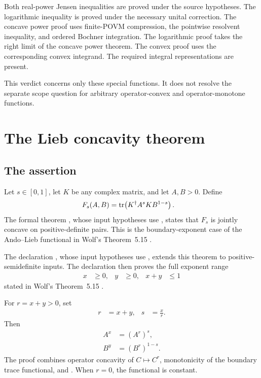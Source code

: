 \documentclass{article}
\begin{document}
Both real-power Jensen inequalities are proved under the source hypotheses.
The logarithmic inequality is proved under the necessary unital correction.
The concave power proof uses finite-POVM compression, the pointwise resolvent
inequality, and ordered Bochner integration. The logarithmic proof takes the
right limit of the concave power theorem. The convex proof uses the
corresponding convex integrand. The required integral representations are
present.

This verdict concerns only these special functions. It does not resolve the
separate scope question for arbitrary operator-convex and operator-monotone
functions.

\section{The Lieb concavity theorem}
\label{sec:wolf_ch5_operator_jensen_lieb_lieb}

\subsection{The assertion}

Let $s\in[0,1]$, let $K$ be any complex matrix, and let $A,B>0$. Define
\begin{align}
    F_s(A,B)
        &=\operatorname{tr}\!\left(K^\dagger A^sKB^{1-s}\right).
    \label{eq:wolf_ch5_operator_jensen_lieb_boundary_functional}
\end{align}
The formal theorem , whose input hypotheses use
, states that $F_s$ is jointly concave on
positive-definite pairs. This is the boundary-exponent case of the Ando--Lieb
functional in Wolf's Theorem~5.15
\cite[Theorem~5.15]{Wolf2012Quantum}.

The declaration , whose input hypotheses use
, extends this theorem to positive-semidefinite
inputs. The declaration  then proves the
full exponent range
\begin{align}
    x&\geq 0,
    &
    y&\geq 0,
    &
    x+y&\leq 1
    \label{eq:wolf_ch5_operator_jensen_lieb_full_exponent_region}
\end{align}
stated in Wolf's Theorem~5.15
\cite[Theorem~5.15]{Wolf2012Quantum}.

For $r=x+y>0$, set
\begin{align}
    r&=x+y,
    &
    s&=\frac{x}{r}.
    \label{eq:wolf_ch5_operator_jensen_lieb_subboundary_parameters}
\end{align}
Then
\begin{align}
    A^x&=(A^r)^s,
    \label{eq:wolf_ch5_operator_jensen_lieb_subboundary_power_a}\\
    B^y&=(B^r)^{1-s}.
    \label{eq:wolf_ch5_operator_jensen_lieb_subboundary_power_b}
\end{align}
The proof combines operator concavity of $C\mapsto C^r$, monotonicity of the
boundary trace functional, and . When $r=0$, the
functional is constant.
\end{document}
